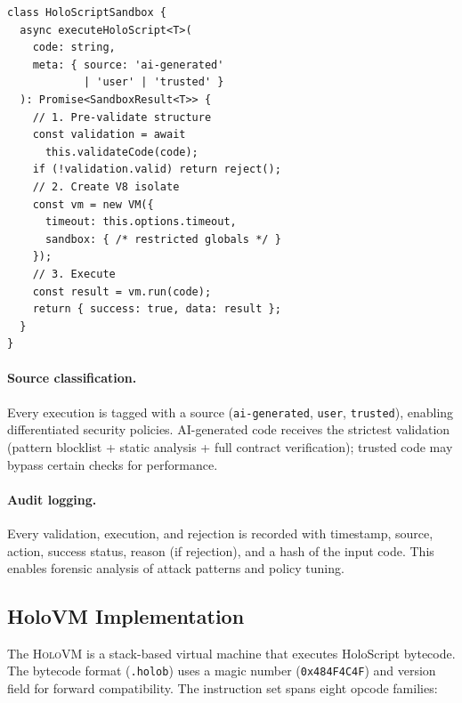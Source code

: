 \documentclass[letterpaper,twocolumn,10pt]{article}
\newcommand{\holoscript}{HoloScript}
\newcommand{\holovm}{\textsc{HoloVM}}
\begin{document}
\begin{lstlisting}[caption={Core sandbox class. The \texttt{executeContractedSimulation} method chains all three layers.}, label={lst:sandbox}]
class HoloScriptSandbox {
  async executeHoloScript<T>(
    code: string,
    meta: { source: 'ai-generated'
            | 'user' | 'trusted' }
  ): Promise<SandboxResult<T>> {
    // 1. Pre-validate structure
    const validation = await
      this.validateCode(code);
    if (!validation.valid) return reject();
    // 2. Create V8 isolate
    const vm = new VM({
      timeout: this.options.timeout,
      sandbox: { /* restricted globals */ }
    });
    // 3. Execute
    const result = vm.run(code);
    return { success: true, data: result };
  }
}
\end{lstlisting}

\paragraph{Source classification.} Every execution is tagged with
a source (\texttt{ai-generated}, \texttt{user}, \texttt{trusted}),
enabling differentiated security policies. AI-generated code receives
the strictest validation (pattern blocklist + static analysis +
full contract verification); trusted code may bypass certain checks
for performance.

\paragraph{Audit logging.} Every validation, execution, and rejection
is recorded with timestamp, source, action, success status, reason
(if rejection), and a hash of the input code. This enables forensic
analysis of attack patterns and policy tuning.

\subsection{HoloVM Implementation}

The \holovm{} is a stack-based virtual machine that executes
\holoscript{} bytecode. The bytecode format (\texttt{.holob}) uses
a magic number (\texttt{0x484F4C4F}) and version field for forward
compatibility. The instruction set spans eight opcode families:
\end{document}
